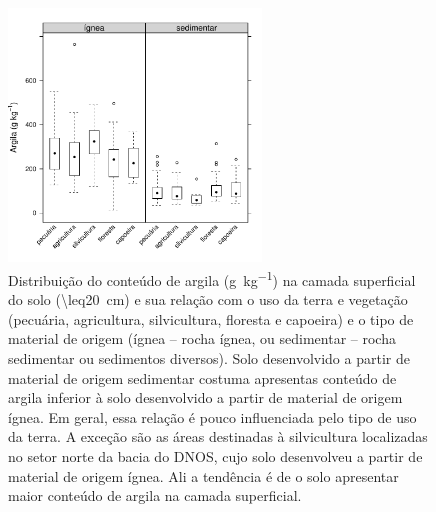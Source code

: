 \begin{figure}[!ht]
\centering
\includegraphics[width=0.60\textwidth]{fig/chap03-clay-land-parent}
\caption[Argila no solo e sua relação com o uso da terra e o material de origem do solo.]{
Distribuição do conteúdo de argila (\si{\gram\per\kilo\gram}) na camada superficial do solo (\SI{\leq20}{\cm}) 
e sua relação com o uso da terra e vegetação (pecuária, agricultura, silvicultura, floresta e capoeira) e o 
tipo de material de origem (ígnea -- rocha ígnea, ou sedimentar -- rocha sedimentar ou sedimentos diversos).
Solo desenvolvido a partir de material de origem sedimentar costuma apresentas conteúdo de argila inferior à 
solo desenvolvido a partir de material de origem ígnea. Em geral, essa relação é pouco influenciada pelo tipo 
de uso da terra. A exceção são as áreas destinadas à silvicultura localizadas no setor norte da bacia do DNOS, 
cujo solo desenvolveu a partir de material de origem ígnea. Ali a tendência é de o solo apresentar maior 
conteúdo de argila na camada superficial.}
\label{fig:chap03-clay-land-parent}
\end{figure}

